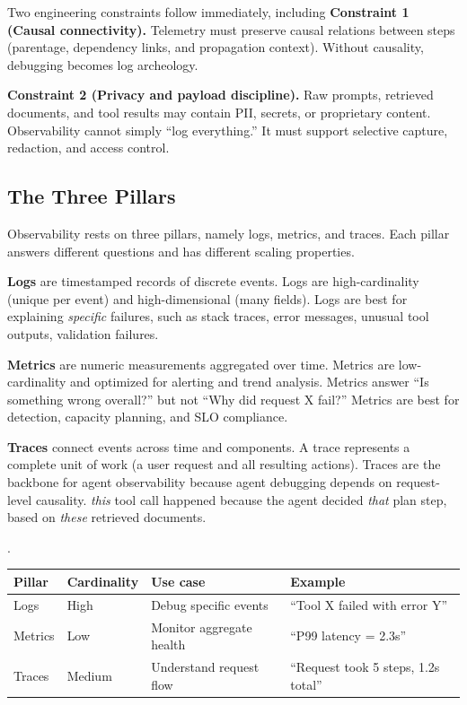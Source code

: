 Two engineering constraints follow immediately, including \textbf{Constraint 1 (Causal connectivity).} Telemetry must preserve causal relations between steps (parentage, dependency links, and propagation context). Without causality, debugging becomes log archeology.

\textbf{Constraint 2 (Privacy and payload discipline).} Raw prompts, retrieved documents, and tool results may contain PII, secrets, or proprietary content. Observability cannot simply ``log everything.'' It must support selective capture, redaction, and access control.

\subsection{The Three Pillars}

Observability rests on three pillars, namely logs, metrics, and traces. Each pillar answers different questions and has different scaling properties.

\textbf{Logs} are timestamped records of discrete events. Logs are high-cardinality (unique per event) and high-dimensional (many fields). Logs are best for explaining \emph{specific} failures, such as stack traces, error messages, unusual tool outputs, validation failures.

\textbf{Metrics} are numeric measurements aggregated over time. Metrics are low-cardinality and optimized for alerting and trend analysis. Metrics answer ``Is something wrong overall?'' but not ``Why did request X fail?'' Metrics are best for detection, capacity planning, and SLO compliance.

\textbf{Traces} connect events across time and components. A trace represents a complete unit of work (a user request and all resulting actions). Traces are the backbone for agent observability because agent debugging depends on request-level causality. \emph{this} tool call happened because the agent decided \emph{that} plan step, based on \emph{these} retrieved documents.

\begin{center}.
\begin{tabular}{llll}
\toprule
Pillar & Cardinality & Use case & Example \\
\midrule
Logs & High & Debug specific events & ``Tool X failed with error Y'' \\
Metrics & Low & Monitor aggregate health & ``P99 latency = 2.3s'' \\
Traces & Medium & Understand request flow & ``Request took 5 steps, 1.2s total'' \\
\bottomrule
\end{tabular}
\end{center}

